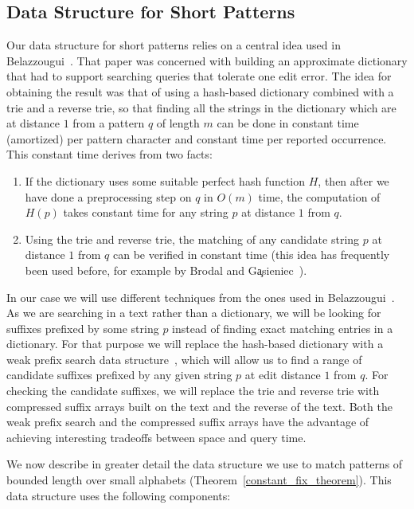 \documentclass{article}
\newcommand{\?}{\mskip1.5mu}
\begin{document}
\subsection{Data Structure for Short Patterns}
\label{section:const_fix_data_struct}
Our data structure for short patterns relies on a central idea used in Belazzougui~\cite{B09}. That paper was concerned with building an approximate dictionary that had to support searching queries that tolerate one edit error. The idea for obtaining the result was that of using a hash-based dictionary combined with a trie and a reverse trie, so that finding all the strings in the dictionary which are at distance $1$ from a pattern $q$ of length $m$ can be done in constant time (amortized) per pattern character and constant time per reported occurrence. This constant time derives from two facts:
\begin{enumerate}
\item If the dictionary uses some suitable perfect hash function $H$, then after we have done a preprocessing step on $q$ in $O(m)$ time, the computation of $H(p)$ takes constant time for any string $p$ at distance $1$ from $q$. 
\item Using the trie and reverse trie, the matching of any candidate string $p$ at distance $1$ from $q$ can be verified in constant time (this idea has frequently been used before, for example by Brodal and G{\c{a}}sieniec~\cite{BG96}). 
\end{enumerate}
In our case we will use different techniques from the ones used in Belazzougui~\cite{B09}. As we are searching in a text rather than a dictionary, we will be looking for suffixes prefixed by some string $p$ instead of finding exact matching entries in a dictionary. For that purpose we will replace the hash-based dictionary with a weak prefix search data structure~\cite{BBPV10},  which will allow us to find a range of candidate suffixes prefixed by any given string $p$ at edit distance $1$ from $q$. For checking the candidate suffixes, we will replace the trie and reverse trie with compressed suffix arrays built on the text and the reverse of the text. Both the weak prefix search and the compressed suffix arrays have the advantage of achieving interesting tradeoffs between space and query time. 

We now describe in greater detail the data structure we use to match patterns of bounded length over small alphabets (Theorem~\ref{constant_fix_theorem}). This data structure uses the following components:
\end{document}
